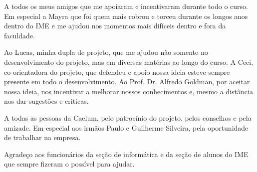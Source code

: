 \documentclass[titlepage,a4paper]{article}
\begin{document}
A todos os meus amigos que me apoiaram e incentivaram durante todo o curso. Em especial a Mayra que foi quem mais cobrou e torceu durante os longos anos dentro do IME e me ajudou nos momentos mais difíceis dentro e fora da faculdade.

Ao Lucas, minha dupla de projeto, que me ajudou não somente no desenvolvimento do projeto, mas em diversas matérias ao longo do curso. A Ceci, co-orientadora do projeto, que defendeu e apoio nossa ideia esteve sempre presente em todo o desenvolvimento. Ao Prof. Dr. Alfredo Goldman, por aceitar nossa ideia, nos incentivar a melhorar nossos conhecimentos e, mesmo a distância nos dar sugestões e criticas.

A todas as pessoas da Caelum, pelo patrocínio do projeto, pelos conselhos e pela amizade. Em especial aos irmãos Paulo e Guilherme Silveira, pela oportunidade de trabalhar na empresa. 

Agradeço aos funcionários da seção de informática e da seção de alunos do IME que sempre fizeram o possível para ajudar.
\end{document}
